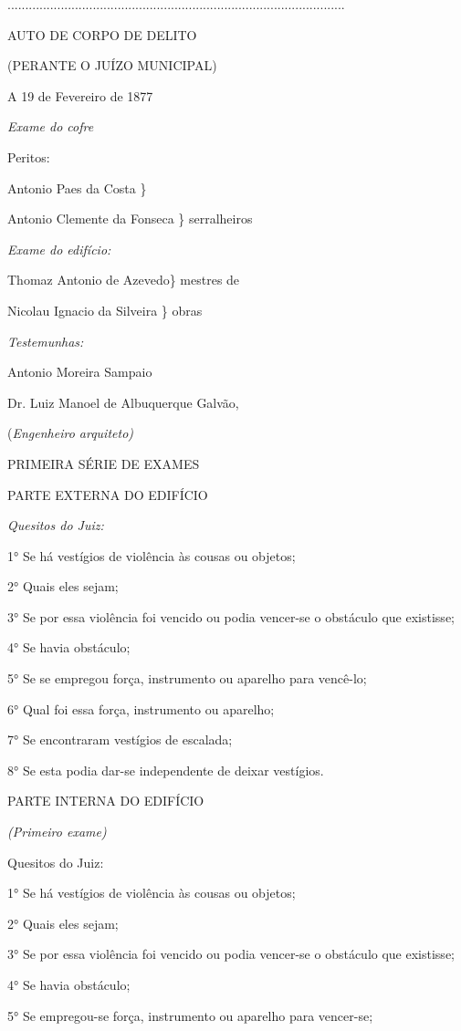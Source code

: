 ...............................................................................................

AUTO DE CORPO DE DELITO

(PERANTE O JUÍZO MUNICIPAL)

A 19 de Fevereiro de 1877

\emph{Exame do cofre}

Peritos:

Antonio Paes da Costa \}

Antonio Clemente da Fonseca \} serralheiros

\emph{Exame do edifício:}

Thomaz Antonio de Azevedo\} mestres de

Nicolau Ignacio da Silveira \} obras

\emph{Testemunhas:}

Antonio Moreira Sampaio

Dr. Luiz Manoel de Albuquerque Galvão,

(\emph{Engenheiro arquiteto)}

PRIMEIRA SÉRIE DE EXAMES

PARTE EXTERNA DO EDIFÍCIO

\emph{Quesitos do Juiz:}

1° Se há vestígios de violência às cousas ou objetos;

2° Quais eles sejam;

3° Se por essa violência foi vencido ou podia vencer-se o obstáculo que
existisse;

4° Se havia obstáculo;

5° Se se empregou força, instrumento ou aparelho para vencê-lo;

6° Qual foi essa força, instrumento ou aparelho;

7° Se encontraram vestígios de escalada;

8° Se esta podia dar-se independente de deixar vestígios.

PARTE INTERNA DO EDIFÍCIO

\emph{(Primeiro exame)}

Quesitos do Juiz:

1° Se há vestígios de violência às cousas ou objetos;

2° Quais eles sejam;

3° Se por essa violência foi vencido ou podia vencer-se o obstáculo que
existisse;

4° Se havia obstáculo;

5° Se empregou-se força, instrumento ou aparelho para vencer-se;

